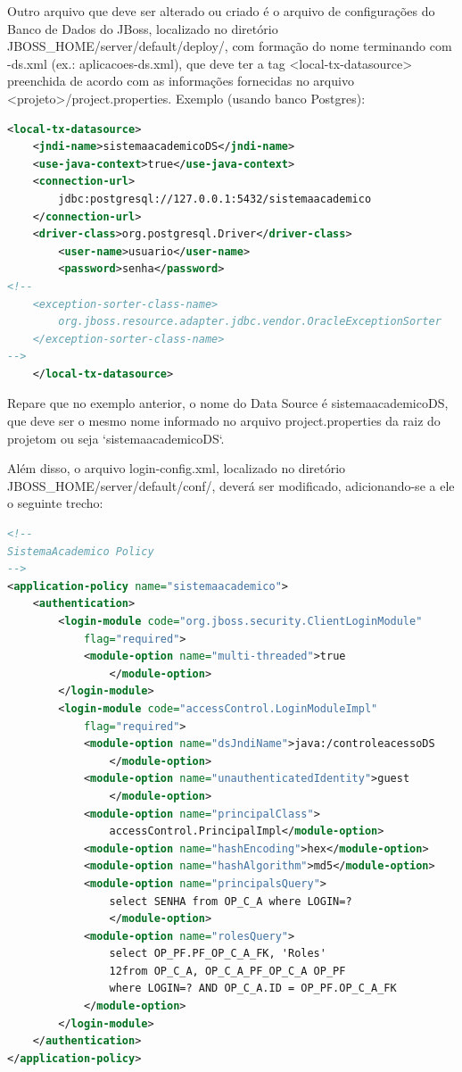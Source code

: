 Outro arquivo que deve ser alterado ou criado é o arquivo de configurações do Banco de
Dados do JBoss, localizado no diretório JBOSS\_HOME/server/default/deploy/, com
formação do nome terminando com -ds.xml (ex.: aplicacoes-ds.xml), que deve ter a tag <local-tx-datasource> preenchida de acordo com as informações fornecidas no arquivo <projeto>/project.properties.
Exemplo (usando banco Postgres):

\begin{lstlisting}[language=xml]
<local-tx-datasource>
	<jndi-name>sistemaacademicoDS</jndi-name>
	<use-java-context>true</use-java-context>
	<connection-url>
		jdbc:postgresql://127.0.0.1:5432/sistemaacademico
	</connection-url> 
	<driver-class>org.postgresql.Driver</driver-class>
		<user-name>usuario</user-name>
		<password>senha</password>
<!--
	<exception-sorter-class-name>
		org.jboss.resource.adapter.jdbc.vendor.OracleExceptionSorter
	</exception-sorter-class-name>
-->
	</local-tx-datasource>
\end{lstlisting}

Repare que no exemplo anterior, o nome do Data Source é
sistemaacademicoDS, que deve ser o mesmo nome informado no arquivo project.properties da raiz do projetom ou
seja `sistemaacademicoDS`.

Além disso, o arquivo login-config.xml, localizado no diretório
JBOSS\_HOME/server/default/conf/, deverá ser modificado, adicionando-se a ele o
seguinte trecho:


\begin{lstlisting}[language=xml]
<!--
SistemaAcademico Policy
-->
<application-policy name="sistemaacademico">
	<authentication>
		<login-module code="org.jboss.security.ClientLoginModule"
			flag="required">
			<module-option name="multi-threaded">true
				</module-option>
		</login-module>
		<login-module code="accessControl.LoginModuleImpl" 
			flag="required">
			<module-option name="dsJndiName">java:/controleacessoDS
				</module-option>
			<module-option name="unauthenticatedIdentity">guest
				</module-option>
			<module-option name="principalClass">
				accessControl.PrincipalImpl</module-option> 
			<module-option name="hashEncoding">hex</module-option> 
			<module-option name="hashAlgorithm">md5</module-option>
			<module-option name="principalsQuery">
				select SENHA from OP_C_A where LOGIN=?
				</module-option>
			<module-option name="rolesQuery">
				select OP_PF.PF_OP_C_A_FK, 'Roles'
				12from OP_C_A, OP_C_A_PF_OP_C_A OP_PF
				where LOGIN=? AND OP_C_A.ID = OP_PF.OP_C_A_FK
			</module-option>
		</login-module>
	</authentication>
</application-policy>
\end{lstlisting}

